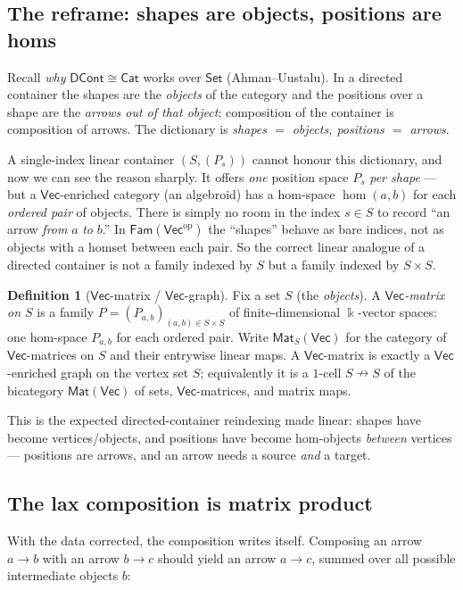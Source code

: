 \documentclass[11pt]{amsart}
\theoremstyle{plain}
\theoremstyle{definition}
\newtheorem{definition}[theorem]{Definition}
\renewcommand{\Vec}{\mathsf{Vec}}
\newcommand{\Set}{\mathsf{Set}}
\newcommand{\Cat}{\mathsf{Cat}}
\newcommand{\Fam}{\mathsf{Fam}}
\newcommand{\Mat}{\mathsf{Mat}}
\newcommand{\op}{\mathrm{op}}
\newcommand{\fld}{\Bbbk}
\newcommand{\iso}{\cong}
\begin{document}
\subsection{The reframe: shapes are objects, positions are homs}

Recall \emph{why} $\mathsf{DCont}\iso\Cat$ works over $\Set$
(Ahman--Uustalu). In a directed container the shapes are the \emph{objects} of the
category and the positions over a shape are the \emph{arrows out of that object};
composition of the container is composition of arrows. The dictionary is
\emph{shapes $=$ objects, positions $=$ arrows}.

A single-index linear container $(S,(P_s))$ cannot honour this dictionary, and now
we can see the reason sharply. It offers \emph{one} position space $P_s$
\emph{per shape} --- but a $\Vec$-enriched category (an algebroid) has a hom-space
$\hom(a,b)$ for each \emph{ordered pair} of objects. There is simply no room in the
index $s\in S$ to record ``an arrow \emph{from} $a$ \emph{to} $b$.'' In
$\Fam(\Vec^\op)$ the ``shapes'' behave as bare indices, not as objects with a homset
between each pair. So the correct linear analogue of a directed container is not a
family indexed by $S$ but a family indexed by $S\times S$.

\begin{definition}[$\Vec$-matrix / $\Vec$-graph]\label{def:vmat}
Fix a set $S$ (the \emph{objects}). A \emph{$\Vec$-matrix on $S$} is a family
$P=(P_{a,b})_{(a,b)\in S\times S}$ of finite-dimensional $\fld$-vector spaces: one
hom-space $P_{a,b}$ for each ordered pair. Write $\Mat_S(\Vec)$ for the category of
$\Vec$-matrices on $S$ and their entrywise linear maps. A $\Vec$-matrix is exactly a
$\Vec$-enriched graph on the vertex set $S$; equivalently it is a $1$-cell
$S\nrightarrow S$ of the bicategory $\Mat(\Vec)$ of sets, $\Vec$-matrices, and
matrix maps.
\end{definition}

This is the expected directed-container reindexing made linear: shapes have become
vertices/objects, and positions have become hom-objects \emph{between} vertices ---
positions are arrows, and an arrow needs a source \emph{and} a target.

\subsection{The lax composition is matrix product}

With the data corrected, the composition writes itself. Composing an arrow
$a\to b$ with an arrow $b\to c$ should yield an arrow $a\to c$, summed over all
possible intermediate objects $b$:
\end{document}
